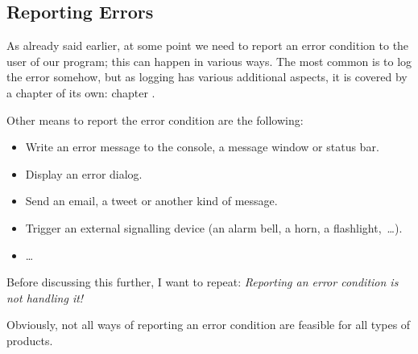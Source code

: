 \subsection{Reporting Errors}\label{sec:ReportingErrors}
As already said earlier, at some point we need to report an error condition to the user of our program; this can happen in various ways. The most common is to log the error somehow, but as logging has various additional aspects, it is covered by a chapter of its own: chapter .

Other means to report the error condition are the following:
\begin{itemize}
\item{Write an error message to the console, a message window or status bar.}
\item{Display an error dialog.}
\item{Send an email, a tweet or another kind of message.}
\item{Trigger an external signalling device (an alarm bell, a horn, a flashlight,~…).}
\item{…}
\end{itemize}

Before discussing this further, I want to repeat: \textit{Reporting an error condition is not handling it!}

Obviously, not all ways of reporting an error condition are feasible for all types of products.


